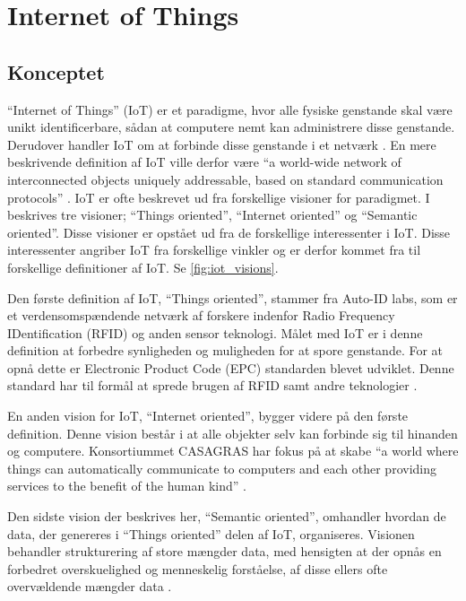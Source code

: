 \section{Internet of Things} %
\label{sec:internet_of_things}

\subsection{Konceptet}
\label{sub:iot_koncept}

\enquote{Internet of Things} (IoT) er et paradigme, hvor alle fysiske genstande skal være unikt identificerbare, sådan at computere nemt kan administrere disse genstande. Derudover handler IoT om at forbinde disse genstande i et netværk \cite{kopetz2011real}. En mere beskrivende definition af IoT ville derfor være \enquote{a world-wide network of interconnected objects uniquely addressable, based on standard communication protocols} \cite{iot_survey_2010}. IoT er ofte beskrevet ud fra forskellige visioner for paradigmet. I \cite{iot_survey_2010}  beskrives tre visioner; \enquote{Things oriented}, \enquote{Internet oriented} og \enquote{Semantic oriented}. Disse visioner er opstået ud fra de forskellige interessenter i IoT. Disse interessenter angriber IoT fra forskellige vinkler og er derfor kommet fra til forskellige definitioner af IoT. Se \cref{fig:iot_visions}.

Den første definition af IoT, \enquote{Things oriented}, stammer fra Auto-ID labs, som er et verdensomspændende netværk af forskere indenfor Radio Frequency IDentification (RFID) og anden sensor teknologi. Målet med IoT er i denne definition at forbedre synligheden og muligheden for at spore genstande. For at opnå dette er Electronic Product Code (EPC) standarden blevet udviklet. Denne standard har til formål at sprede brugen af RFID samt andre teknologier \cite{iot_survey_2010}.

En anden vision for IoT, \enquote{Internet oriented}, bygger videre på den første definition. Denne vision består i at alle objekter selv kan forbinde sig til hinanden og computere. Konsortiummet CASAGRAS har fokus på at skabe \enquote{a world where things can automatically communicate to computers and each other providing services to the benefit of the human kind} \cite{iot_survey_2010}.

Den sidste vision der beskrives her, \enquote{Semantic oriented}, omhandler hvordan de data, der genereres i \enquote{Things oriented} delen af IoT, organiseres. Visionen behandler strukturering af store mængder data, med hensigten at der opnås en forbedret overskuelighed og menneskelig forståelse, af disse ellers ofte overvældende mængder data \cite{iot_semantics_2012}.


